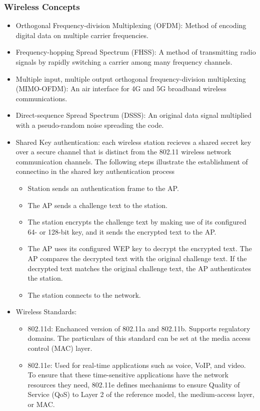 \subsubsection{Wireless Concepts}
\begin{itemize}
    \item Orthogonal Frequency-division Multiplexing (OFDM): Method of encoding digital data on multiple carrier frequencies.
    \item Frequency-hopping Spread Spectrum (FHSS): A method of transmitting radio signals by rapidly switching a carrier among many frequency channels.
    \item Multiple input, multiple output orthogonal frequency-division multiplexing (MIMO-OFDM): An air interface for 4G and 5G broadband wireless communications.
    \item Direct-sequence Spread Spectrum (DSSS): An original data signal multiplied with a pseudo-random noise spreading the code.
    \item Shared Key authentication: each wireless station recieves a shared secret key over a secure channel that is distinct from the 802.11 wireless network communication channels. The following steps illustrate the establishment of connectino in the shared key authentication process
    \begin{itemize}
        \item Station sends an authentication frame to the AP.
        \item The AP sends a challenge text to the station.
        \item The station encrypts the challenge text by making use of its configured 64- or 128-bit key, and it sends the encrypted text to the AP.
        \item The AP uses its configured WEP key to decrypt the encrypted text. The AP compares the decrypted text with the original challenge text. If the decrypted text matches the original challenge text, the AP authenticates the station.
        \item The station connects to the network.
    \end{itemize}
    \item Wireless Standards:
    \begin{itemize}
        \item 802.11d: Enchanced version of 802.11a and 802.11b. Supports regulatory domains. The particulars of this standard can be set at the media access control (MAC) layer.
        \item 802.11e: Used for real-time applications such as voice, VoIP, and video. To ensure that these time-sensitive applications have the network resources they need, 802.11e defines mechanisms to ensure Quality of Service (QoS) to Layer 2 of the reference model, the medium-access layer, or MAC.

\end{itemize}
\end{itemize}
